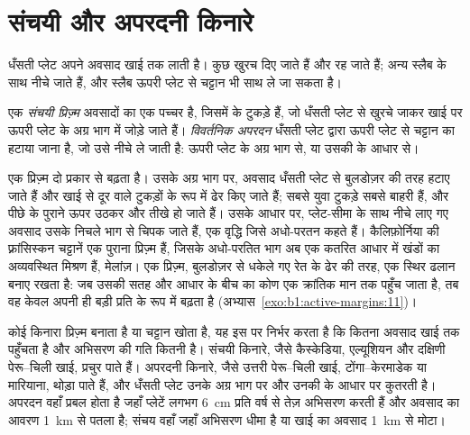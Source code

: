 \section{संचयी और अपरदनी किनारे}\label{sec:b1:active-margins:prisms}

धँसती प्लेट अपने अवसाद खाई तक लाती है। कुछ खुरच दिए जाते हैं और रह जाते हैं; अन्य स्लैब के साथ नीचे जाते हैं, और स्लैब ऊपरी प्लेट से चट्टान भी साथ ले जा सकता है।

\begin{definition}[संचयी प्रिज़्म, विवर्तनिक अपरदन]\label{def:b1:active-margins:accretionary}
एक \emph{संचयी प्रिज़्म} अवसादों का एक पच्चर है, जिसमें  के टुकड़े हैं, जो धँसती प्लेट से खुरचे जाकर खाई पर ऊपरी प्लेट के अग्र भाग में जोड़े जाते हैं। \emph{विवर्तनिक अपरदन} धँसती प्लेट द्वारा ऊपरी प्लेट से चट्टान का हटाया जाना है, जो उसे नीचे ले जाती है: ऊपरी प्लेट के अग्र भाग से, या उसकी  के आधार से।
\end{definition}

एक प्रिज़्म दो प्रकार से बढ़ता है। उसके अग्र भाग पर, अवसाद धँसती प्लेट से बुलडोज़र की तरह हटाए जाते हैं और खाई से दूर  वाले टुकड़ों के रूप में ढेर किए जाते हैं; सबसे युवा टुकड़े सबसे बाहरी हैं, और पीछे के पुराने ऊपर उठकर और तीखे हो जाते हैं। उसके आधार पर, प्लेट-सीमा के साथ नीचे लाए गए अवसाद उसके निचले भाग से चिपक जाते हैं, एक वृद्धि जिसे अधो-परतन कहते हैं। कैलिफ़ोर्निया की फ़्रांसिस्कन चट्टानें एक पुराना प्रिज़्म हैं, जिसके अधो-परतित भाग अब एक कतरित आधार में खंडों का अव्यवस्थित मिश्रण हैं, मेलांज़। एक प्रिज़्म, बुलडोज़र से धकेले गए रेत के ढेर की तरह, एक स्थिर ढलान बनाए रखता है: जब उसकी सतह और आधार के बीच का कोण एक क्रांतिक मान तक पहुँच जाता है, तब वह केवल अपनी ही बड़ी प्रति के रूप में बढ़ता है (अभ्यास~\ref{exo:b1:active-margins:11})।

कोई किनारा प्रिज़्म बनाता है या चट्टान खोता है, यह इस पर निर्भर करता है कि कितना अवसाद खाई तक पहुँचता है और अभिसरण की गति कितनी है। संचयी किनारे, जैसे कैस्केडिया, एल्यूशियन और दक्षिणी पेरू–चिली खाई, प्रचुर पाते हैं। अपरदनी किनारे, जैसे उत्तरी पेरू–चिली खाई, टोंगा–केरमाडेक या मारियाना, थोड़ा पाते हैं, और धँसती प्लेट उनके अग्र भाग पर और उनकी  के आधार पर कुतरती है। अपरदन वहाँ प्रबल होता है जहाँ प्लेटें लगभग \qty{6}{cm} प्रति वर्ष से तेज़ अभिसरण करती हैं और अवसाद का आवरण \qty{1}{km} से पतला है; संचय वहाँ जहाँ अभिसरण धीमा है या खाई का अवसाद \qty{1}{km} से मोटा।

